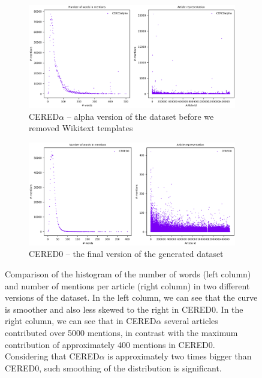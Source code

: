\begin{figure}
\begin{subfigure}{1\textwidth}
\centering
\includegraphics[width = 1\textwidth]{./img/Histograms_2020-07-19_21-00-53_CEREDalpha.png}
\caption{CERED$\alpha$ -- alpha version of the dataset before we removed Wikitext templates}
\end{subfigure}
\par\medskip
\begin{subfigure}{1\textwidth}
\centering
\includegraphics[width = 1\textwidth]{./img/Histograms_2020-07-19_21-00-53_CERED0.png}
\caption{CERED0 -- the final version of the generated dataset}
\end{subfigure}
\caption{Comparison of the histogram of the number of words (left column) and number of mentions per article (right column) in two different versions of the dataset. In the left column, we can see that the curve is smoother and also less skewed to the right in CERED0. In the right column, we can see that in CERED$\alpha$ several articles contributed over \num{5000} mentions, in contrast with the maximum contribution of approximately 400 mentions in CERED0. Considering that CERED$\alpha$ is approximately two times bigger than CERED0, such smoothing of the distribution is significant.}
\label{obr:ukazka_histogramu}
\end{figure}

